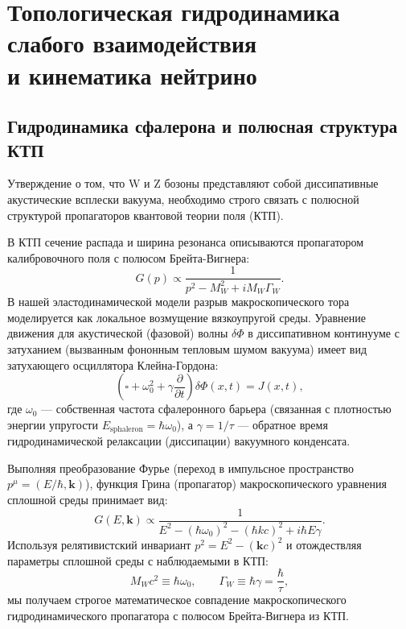\documentclass[11pt,a4paper]{article}
\begin{document}
	\section{Топологическая гидродинамика слабого взаимодействия\\ и кинематика нейтрино}
	
	\subsection{Гидродинамика сфалерона и полюсная структура КТП}
	Утверждение о том, что W и Z бозоны представляют собой диссипативные акустические всплески вакуума, необходимо строго связать с полюсной структурой пропагаторов квантовой теории поля (КТП).
	
	В КТП сечение распада и ширина резонанса описываются пропагатором калибровочного поля с полюсом Брейта-Вигнера:
	\begin{equation}
		G(p) \propto \frac{1}{p^2 - M_W^2 + i M_W \Gamma_W}.
	\end{equation}
	В нашей эластодинамической модели разрыв макроскопического тора моделируется как локальное возмущение вязкоупругой среды. Уравнение движения для акустической (фазовой) волны $\delta \Phi$ в диссипативном континууме с затуханием (вызванным фононным тепловым шумом вакуума) имеет вид затухающего осциллятора Клейна-Гордона:
	\begin{equation}
		\left( \square + \omega_0^2 + \gamma \frac{\partial}{\partial t} \right) \delta \Phi(x,t) = J(x,t),
	\end{equation}
	где $\omega_0$ — собственная частота сфалеронного барьера (связанная с плотностью энергии упругости $E_{\text{sphaleron}} = \hbar \omega_0$), а $\gamma = 1/\tau$ — обратное время гидродинамической релаксации (диссипации) вакуумного конденсата.
	
	Выполняя преобразование Фурье (переход в импульсное пространство $p^\mu = (E/\hbar, \mathbf{k})$), функция Грина (пропагатор) макроскопического уравнения сплошной среды принимает вид:
	\begin{equation}
		G(E, \mathbf{k}) \propto \frac{1}{E^2 - (\hbar\omega_0)^2 - (\hbar k c)^2 + i \hbar E \gamma}.
	\end{equation}
	Используя релятивистский инвариант $p^2 = E^2 - (\mathbf{k}c)^2$ и отождествляя параметры сплошной среды с наблюдаемыми в КТП:
	\begin{equation}
		M_W c^2 \equiv \hbar \omega_0, \qquad \Gamma_W \equiv \hbar \gamma = \frac{\hbar}{\tau},
	\end{equation}
	мы получаем строгое математическое совпадение макроскопического гидродинамического пропагатора с полюсом Брейта-Вигнера из КТП. 
	
\end{document}
